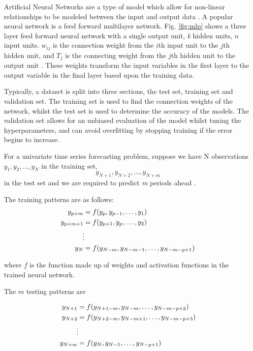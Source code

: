 Artificial Neural Networks are a type of model which allow for non-linear relationships to be modeled between the input and output data \cite{Akaike1974}. A popular neural network is a feed forward multilayer network. Fig. \ref{fig:mlp} shows a three layer feed forward neural network with a single output unit, \textit{k} hidden units, $n$ input units. $w_{ij}$ is the connection weight from the $i$th input unit to the $j$th hidden unit,  and $T_j$ is the connecting weight from the $j$th hidden unit to the output unit \cite{Pao2007}. These weights transform the input variables in the first layer to the output variable in the final layer based upon the training data. 

Typically, a dataset is split into three sections, the test set, training set and validation set. The training set is used to find the connection weights of the network, whilst the test set is used to determine the accuracy of the models. The validation set allows for an unbiased evaluation of the model whilst tuning the hyperparameters, and can avoid overfitting by stopping training if the error begins to increase.

For a univariate time series forecasting problem, suppose we have N observations $y_1, y_2, \ldots, y_N$ in the training set, 
\begin{equation}
y_{N+1}, y_{N+2}, \ldots, y_{N+m}
\end{equation}
\noindent in the test set and we are required to predict \textit{m} periods ahead \cite{Pao2007}. 

The training patterns are as follows:
\begin{align}
y_{p+m} & =f(y_p, y_{p-1},\ldots,y_1)\\
y_{p+m+1} & =f(y_{p+1}, y_{p},\ldots,y_2)\\
&\vdotswithin  \notag \\
y_{N} & =f(y_{N-m},y_{N-m-1},\ldots,y_{N-m-p+1})
\end{align}

\noindent where $f$ is the function made up of weights and activation functions in the trained neural network.

The $m$ testing patterns are 

\begin{align}
y_{N+1} & =f(y_{N+1-m}, y_{N-m},\ldots,y_{N-m-p+2})\\
y_{N+2} & =f(y_{N+2-m}, y_{N-m+1},\ldots,y_{N-m-p+3})\\
&\vdotswithin  \notag \\
y_{N+m} & =f(y_{N},y_{N-1},\ldots,y_{N-p+1})
\end{align}


